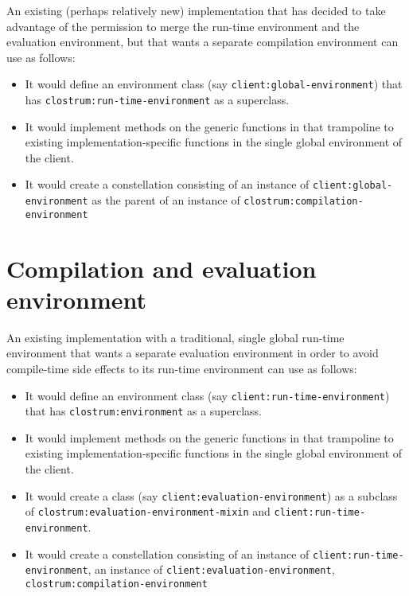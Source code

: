 An existing (perhaps relatively new) \commonlisp{} implementation that
has decided to take advantage of the permission to merge the run-time
environment and the evaluation environment, but that wants a separate
compilation environment can use \sysname{} as follows:

\begin{itemize}
\item It would define an environment class  (say
  \texttt{client:global-environment}) that has
  \texttt{clostrum:run-time-environment} as a superclass.
\item It would implement methods on the generic functions in
   that trampoline to existing
  implementation-specific functions in the single global environment
  of the client.
\item It would create a constellation consisting of an instance of
  \texttt{client:global-environment} as the parent of an instance of
  \texttt{clostrum:compilation-environment}
\end{itemize}

\section{Compilation and evaluation environment}

An existing \commonlisp{} implementation with a traditional, single
global run-time environment that wants a separate evaluation
environment in order to avoid compile-time side effects to its
run-time environment can use \sysname{} as follows:

\begin{itemize}
\item It would define an environment class  (say
  \texttt{client:run-time-environment}) that has
  \texttt{clostrum:environment} as a superclass.
\item It would implement methods on the generic functions in
   that trampoline to existing
  implementation-specific functions in the single global environment
  of the client.
\item It would create a class (say
  \texttt{client:evaluation-environment}) as a subclass of
  \texttt{clostrum:evaluation-environment-mixin} and
  \texttt{client:run-time-environment}.
\item It would create a constellation consisting of an instance of
  \texttt{client:run-time-environment}, an instance of
  \texttt{client:evaluation-environment},
  \texttt{clostrum:compilation-environment}
\end{itemize}

